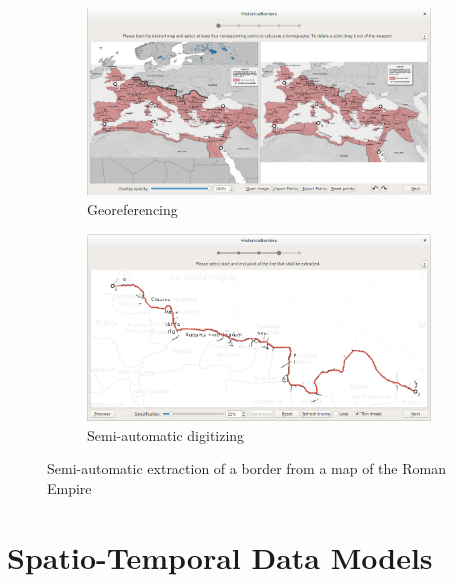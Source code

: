 \begin{figure}[ht]
  \centering
  \begin{subfigure}{0.48\textwidth}
    \centering
    \includegraphics[width=0.95\linewidth]{graphics/basics/hgis/hibo1.png}
    \caption{Georeferencing}
  \end{subfigure}
  \begin{subfigure}{0.48\textwidth}
    \centering
    \includegraphics[width=0.95\linewidth]{graphics/basics/hgis/hibo2.png}
    \caption{Semi-automatic digitizing}
  \end{subfigure}
  \caption{Semi-automatic extraction of a border from a map of the Roman Empire \cite{hibo}}
  \vspace{2em} %
  \label{fig:hibo}
\end{figure}






\section{Spatio-Temporal Data Models} %
\label{sec:spatio_temporal_data_models}

